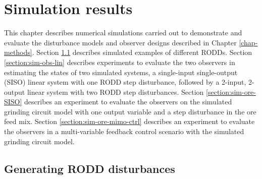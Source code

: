 \chapter{Simulation results}  \label{chap-simulation}

This chapter describes numerical simulations carried out to demonstrate and evaluate the disturbance models and observer designs described in Chapter \ref{chap-methods}. Section \ref{section:sim-RODDs} describes simulated examples of different RODDs. Section \ref{section:sim-obs-lin} describes experiments to evaluate the two observers in estimating the states of two simulated systems, a single-input single-output (SISO) linear system with one RODD step disturbance, followed by a 2-input, 2-output linear system with two RODD step disturbances. Section \ref{section:sim-ore-SISO} describes an experiment to evaluate the observers on the simulated grinding circuit model with one output variable and a step disturbance in the ore feed mix. Section \ref{section:sim-ore-mimo-ctrl} describes an experiment to evaluate the observers in a multi-variable feedback control scenario with the simulated grinding circuit model.


\section{Generating RODD disturbances} \label{section:sim-RODDs}

